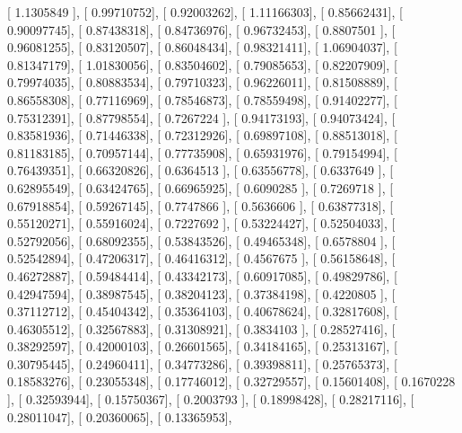 \documentclass{article}
\begin{document}
       [ 1.1305849 ],
       [ 0.99710752],
       [ 0.92003262],
       [ 1.11166303],
       [ 0.85662431],
       [ 0.90097745],
       [ 0.87438318],
       [ 0.84736976],
       [ 0.96732453],
       [ 0.8807501 ],
       [ 0.96081255],
       [ 0.83120507],
       [ 0.86048434],
       [ 0.98321411],
       [ 1.06904037],
       [ 0.81347179],
       [ 1.01830056],
       [ 0.83504602],
       [ 0.79085653],
       [ 0.82207909],
       [ 0.79974035],
       [ 0.80883534],
       [ 0.79710323],
       [ 0.96226011],
       [ 0.81508889],
       [ 0.86558308],
       [ 0.77116969],
       [ 0.78546873],
       [ 0.78559498],
       [ 0.91402277],
       [ 0.75312391],
       [ 0.87798554],
       [ 0.7267224 ],
       [ 0.94173193],
       [ 0.94073424],
       [ 0.83581936],
       [ 0.71446338],
       [ 0.72312926],
       [ 0.69897108],
       [ 0.88513018],
       [ 0.81183185],
       [ 0.70957144],
       [ 0.77735908],
       [ 0.65931976],
       [ 0.79154994],
       [ 0.76439351],
       [ 0.66320826],
       [ 0.6364513 ],
       [ 0.63556778],
       [ 0.6337649 ],
       [ 0.62895549],
       [ 0.63424765],
       [ 0.66965925],
       [ 0.6090285 ],
       [ 0.7269718 ],
       [ 0.67918854],
       [ 0.59267145],
       [ 0.7747866 ],
       [ 0.5636606 ],
       [ 0.63877318],
       [ 0.55120271],
       [ 0.55916024],
       [ 0.7227692 ],
       [ 0.53224427],
       [ 0.52504033],
       [ 0.52792056],
       [ 0.68092355],
       [ 0.53843526],
       [ 0.49465348],
       [ 0.6578804 ],
       [ 0.52542894],
       [ 0.47206317],
       [ 0.46416312],
       [ 0.4567675 ],
       [ 0.56158648],
       [ 0.46272887],
       [ 0.59484414],
       [ 0.43342173],
       [ 0.60917085],
       [ 0.49829786],
       [ 0.42947594],
       [ 0.38987545],
       [ 0.38204123],
       [ 0.37384198],
       [ 0.4220805 ],
       [ 0.37112712],
       [ 0.45404342],
       [ 0.35364103],
       [ 0.40678624],
       [ 0.32817608],
       [ 0.46305512],
       [ 0.32567883],
       [ 0.31308921],
       [ 0.3834103 ],
       [ 0.28527416],
       [ 0.38292597],
       [ 0.42000103],
       [ 0.26601565],
       [ 0.34184165],
       [ 0.25313167],
       [ 0.30795445],
       [ 0.24960411],
       [ 0.34773286],
       [ 0.39398811],
       [ 0.25765373],
       [ 0.18583276],
       [ 0.23055348],
       [ 0.17746012],
       [ 0.32729557],
       [ 0.15601408],
       [ 0.1670228 ],
       [ 0.32593944],
       [ 0.15750367],
       [ 0.2003793 ],
       [ 0.18998428],
       [ 0.28217116],
       [ 0.28011047],
       [ 0.20360065],
       [ 0.13365953],
\end{document}
